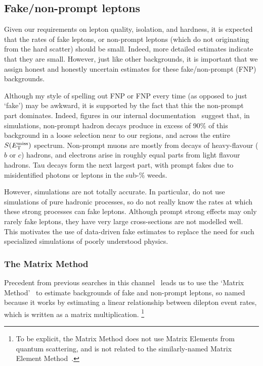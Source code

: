 \subsection{Fake/non-prompt leptons}
\label{sec:2ljets_mm_fakes}
Given our requirements on lepton quality, isolation, and hardness, it is
expected that the rates of fake leptons, or non-prompt leptons (which do not
originating from the hard scatter) should be small.
Indeed, more detailed estimates indicate that they are small.
However, just like other backgrounds, it is important that we assign
honest and honestly uncertain estimates for these fake/non-prompt (FNP)
backgrounds.

Although my style of spelling out FNP or FNP every time
(as opposed to just `fake') may be awkward, it is supported by the fact that this
the non-prompt part dominates.
Indeed, figures in our internal documentation~\cite{twoljets2018int} suggest
that, in simulations, non-prompt hadron decays produce in excess of $90\%$ of
this background in a loose selection near to our regions, and across the
entire $S(E_\mathrm{T}^\mathrm{miss})$ spectrum.
Non-prompt muons are mostly from decays of heavy-flavour ($b$ or $c$) hadrons,
and electrons arise in roughly equal parts from light flavour hadrons.
Tau decays form the next largest part, with prompt fakes due to misidentified
photons or leptons in the sub-$\%$ weeds.

However, simulations are not totally accurate.
In particular, do not use simulations of pure hadronic processes, so do not
really know the rates at which these strong processes can fake leptons.
Although prompt strong effects may only rarely fake leptons, they have very
large cross-sections are not modelled well.
This motivates the use of data-driven fake estimates to replace the need for
such specialized simulations of poorly understood physics.

\subsubsection{The Matrix Method}
\label{sec:2ljets_matrix_method}
Precedent from previous searches in this channel~\cite{
atlas_2l_SUSY_2013_11,
atlas_23l_SUSY_2016_24
}
leads us to use the `Matrix Method'~\cite{
ATLAS-CONF-2014-058,
D0:1999qdf
}%
to estimate
backgrounds of fake and non-prompt leptons, so named because it works by
estimating a linear relationship between dilepton event rates, which is
written as a matrix multiplication.%
\footnote{%
To be explicit, the Matrix Method does not use Matrix Elements from quantum
scattering, and is not related to the similarly-named
Matrix Element Method~\cite{gainer2013matrix}.
}

